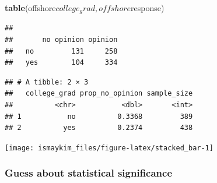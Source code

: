 \documentclass[]{tufte-book}
\newenvironment{Shaded}{\begin{snugshade}}{\end{snugshade}}
\newcommand{\KeywordTok}[1]{\textcolor[rgb]{0.13,0.29,0.53}{\textbf{{#1}}}}
\newcommand{\DataTypeTok}[1]{\textcolor[rgb]{0.13,0.29,0.53}{{#1}}}
\newcommand{\StringTok}[1]{\textcolor[rgb]{0.31,0.60,0.02}{{#1}}}
\newcommand{\NormalTok}[1]{{#1}}
\begin{document}
\begin{Shaded}
\begin{Highlighting}[]
\KeywordTok{table}\NormalTok{(offshore$college_grad, offshore$response)}
\end{Highlighting}
\end{Shaded}

\begin{verbatim}
##      
##       no opinion opinion
##   no         131     258
##   yes        104     334
\end{verbatim}

\begin{Shaded}
\end{Shaded}

\begin{verbatim}
## # A tibble: 2 × 3
##   college_grad prop_no_opinion sample_size
##          <chr>           <dbl>       <int>
## 1           no          0.3368         389
## 2          yes          0.2374         438
\end{verbatim}

\begin{Shaded}
\end{Shaded}

\begin{center}\texttt{[image: ismaykim\_files/figure-latex/stacked\_bar-1]} \end{center}

\subsubsection{Guess about statistical
significance}\label{guess-about-statistical-significance-2}
\end{document}
